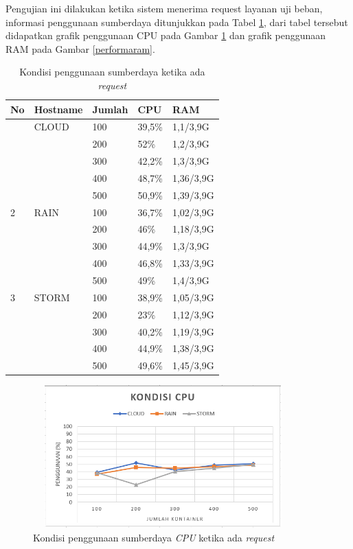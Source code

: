 				Pengujian ini dilakukan ketika sistem menerima request layanan uji beban, informasi penggunaan sumberdaya ditunjukkan pada Tabel \ref{sdhasilperforma}, dari tabel tersebut didapatkan grafik penggunaan CPU pada Gambar \ref{performacpu} dan grafik penggunaan RAM pada Gambar \ref{performaram}.
				\begin{longtable}{|p{}|p{}|p{}|p{}|p{}|}
					\caption{Kondisi penggunaan sumberdaya ketika ada \textit{request}} \label{sdhasilperforma} \\
					\hline
					\textbf{No} & \textbf{Hostname} & \textbf{Jumlah} & \textbf{CPU} & \textbf{RAM} \\ \hline
					\endhead
					\endfoot
					\endlastfoot
					1 & CLOUD & 100 & 39,5\% & 1,1/3,9G \\ \cline{3-5}
					&& 200 & 52\% & 1,2/3,9G \\ \cline{3-5}
					&& 300 & 42,2\% & 1,3/3,9G \\ \cline{3-5}
					&& 400 & 48,7\% & 1,36/3,9G \\ \cline{3-5}
					&& 500 & 50,9\% & 1,39/3,9G \\ \hline
					2 & RAIN & 100 & 36,7\% & 1,02/3,9G \\ \cline{3-5}
					&& 200 & 46\% & 1,18/3,9G \\ \cline{3-5}
					&& 300 & 44,9\% & 1,3/3,9G \\ \cline{3-5}
					&& 400 & 46,8\% & 1,33/3,9G \\ \cline{3-5}
					&& 500 & 49\% & 1,4/3,9G \\ \hline
					3 & STORM & 100 & 38,9\% & 1,05/3,9G \\ \cline{3-5}
					&& 200 & 23\% & 1,12/3,9G \\ \cline{3-5}
					&& 300 & 40,2\% & 1,19/3,9G \\ \cline{3-5}
					&& 400 & 44,9\% & 1,38/3,9G \\ \cline{3-5}
					&& 500 & 49,6\% & 1,45/3,9G \\ \hline
				\end{longtable}
			
				\begin{figure}[H]
					\centering
					\includegraphics[width=10cm,height=5.5cm]{Images/C-5/performacpu.PNG}
					\caption{Kondisi penggunaan sumberdaya \textit{CPU} ketika ada \textit{request}}
					\label{performacpu}
				\end{figure}
			

